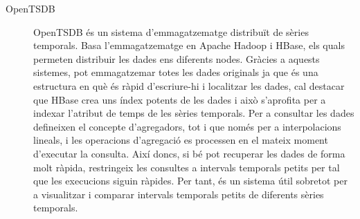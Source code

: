 \begin{description}
\item[OpenTSDB] OpenTSDB \parencite{opentsdb} és un sistema
  d'emmagatzematge distribuït de sèries temporals. Basa
  l'emmagatzematge en Apache Hadoop i HBase, els quals permeten
  distribuir les dades ens diferents nodes. Gràcies a aquests
  sistemes, pot emmagatzemar totes les dades originals ja que és una
  estructura en què és ràpid d'escriure-hi i localitzar les dades, cal
  destacar que HBase crea uns índex potents de les dades i això
  s'aprofita per a indexar l'atribut de temps de les sèries temporals.
  Per a consultar les dades defineixen el concepte d'agregadors, tot i
  que només per a interpolacions lineals, i les operacions d'agregació
  es processen en el mateix moment d'executar la consulta.  Així
  doncs, si bé pot recuperar les dades de forma molt ràpida,
  restringeix les consultes a intervals temporals petits per tal que
  les execucions siguin ràpides. Per tant, és un sistema útil sobretot
  per a visualitzar i comparar intervals temporals petits de diferents
  sèries temporals.




\end{description}






























